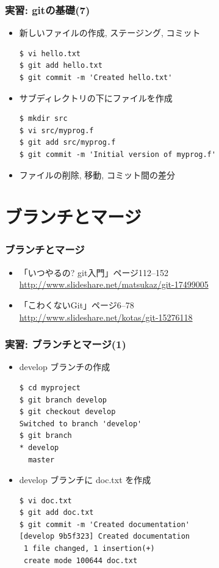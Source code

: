 \begin{frame}[t,fragile]
  \frametitle{実習: gitの基礎(7)}
  \begin{itemize}
  \item 新しいファイルの作成, ステージング, コミット
\begin{lstlisting}
$ vi hello.txt
$ git add hello.txt
$ git commit -m 'Created hello.txt'
\end{lstlisting}
  \item サブディレクトリの下にファイルを作成
\begin{lstlisting}
$ mkdir src
$ vi src/myprog.f
$ git add src/myprog.f
$ git commit -m 'Initial version of myprog.f'
\end{lstlisting}
  \item ファイルの削除, 移動, コミット間の差分
  \end{itemize}
\end{frame}

\section{ブランチとマージ}

\begin{frame}
  \frametitle{ブランチとマージ}
  \begin{itemize}
  \item 「いつやるの? git入門」ページ112--152 \\
    \url{http://www.slideshare.net/matsukaz/git-17499005}
  \item 「こわくないGit」ページ6--78 \\
    \url{http://www.slideshare.net/kotas/git-15276118}
  \end{itemize}
\end{frame}

\begin{frame}[t,fragile]
  \frametitle{実習: ブランチとマージ(1)}
  \begin{itemize}
  \item develop ブランチの作成
\begin{lstlisting}
$ cd myproject
$ git branch develop
$ git checkout develop
Switched to branch 'develop'
$ git branch
* develop
  master
\end{lstlisting}
  \item develop ブランチに doc.txt を作成
\begin{lstlisting}
$ vi doc.txt
$ git add doc.txt
$ git commit -m 'Created documentation'
[develop 9b5f323] Created documentation
 1 file changed, 1 insertion(+)
 create mode 100644 doc.txt
\end{lstlisting}
  \end{itemize}
\end{frame}

